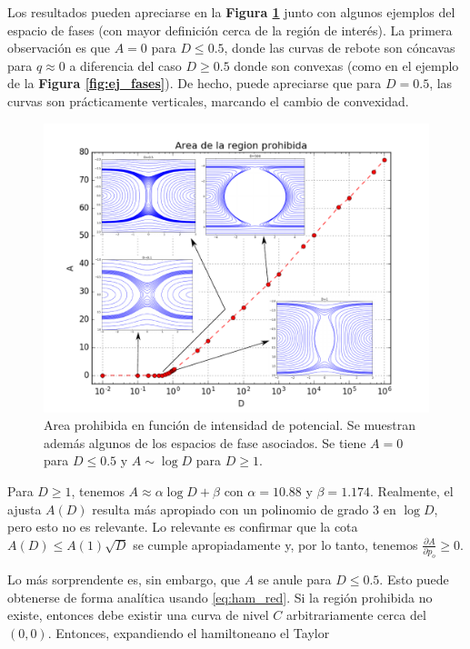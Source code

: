 \documentclass[twoside, 12pt]{article}
\providecommand{\dpart}[2]{\frac{\partial#1}{\partial#2}}
\begin{document}
Los resultados pueden apreciarse en la \textbf{Figura \ref{fig:AvsD}} junto con algunos ejemplos del espacio de fases (con mayor definición cerca de la región de interés).
La primera observación es que $A=0$ para $D\leq 0.5$, donde las curvas de rebote son cóncavas para $q\approx 0$ a diferencia del caso $D\geq 0.5$ donde son convexas (como en el ejemplo 
de la \textbf{Figura \ref{fig:ej_fases}}). De hecho, puede apreciarse que para $D=0.5$, las curvas son prácticamente verticales, marcando el cambio de convexidad.

\begin{figure}[H]
	\centering
	\includegraphics[trim = 0mm 0mm 15mm 10mm, clip, width=\columnwidth]{AvsD_full.pdf}
	\caption{Area prohibida en función de intensidad de potencial. Se muestran además algunos de los espacios de fase asociados. Se tiene $A=0$ para $D\leq 0.5$ y $A\sim \log{D}$ para $D\geq 1$.}
	\label{fig:AvsD}
\end{figure}

Para $D\geq 1$, tenemos $A \approx \alpha \log{D} + \beta$ con $\alpha = 10.88$ y $\beta = 1.174$.
Realmente, el ajusta $A(D)$ resulta más apropiado con un polinomio de grado 3 en $\log{D}$, pero esto no es relevante.
Lo relevante es confirmar que la cota $A(D) \leq A(1)\sqrt{D}$ se cumple apropiadamente y, por lo tanto, tenemos $\dpart{A}{p_o} \geq 0$.

Lo más sorprendente es, sin embargo, que $A$ se anule para $D\leq 0.5$. Esto puede obtenerse de forma analítica usando \eqref{eq:ham_red}.
Si la región prohibida no existe, entonces debe existir una curva de nivel $C$ arbitrariamente cerca del $(0,0)$. Entonces, expandiendo el hamiltoneano el Taylor
\end{document}
